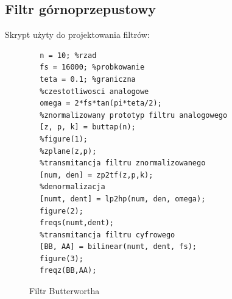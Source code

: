 \documentclass[12pt,titlepage]{report}
\begin{document}
\subsection{Filtr górnoprzepustowy}
Skrypt użyty do projektowania filtrów:
\begin{multicols}{3}
	{
		\tiny
		\begin{verbatim}
		n = 10; %rzad
		fs = 16000; %probkowanie
		teta = 0.1; %graniczna
		%czestotliwosci analogowe
		omega = 2*fs*tan(pi*teta/2);
		%znormalizowany prototyp filtru analogowego
		[z, p, k] = buttap(n);
		%figure(1);
		%zplane(z,p);
		%transmitancja filtru znormalizowanego
		[num, den] = zp2tf(z,p,k);
		%denormalizacja
		[numt, dent] = lp2hp(num, den, omega);
		figure(2);
		freqs(numt,dent);
		%transmitancja filtru cyfrowego
		[BB, AA] = bilinear(numt, dent, fs);
		figure(3);
		freqz(BB,AA);
		\end{verbatim}
	}
\end{multicols}
\begin{figure}[!h]
	\centering
	\caption{Filtr Butterwortha}
\end{figure}
\end{document}
